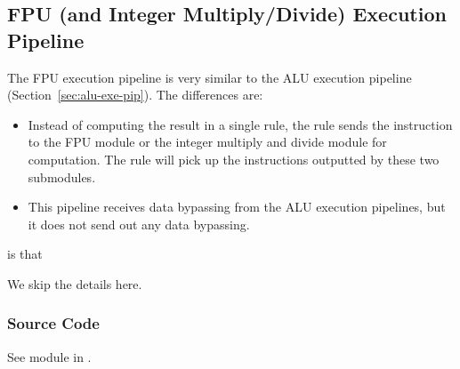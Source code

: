 \subsection{FPU (and Integer Multiply/Divide) Execution Pipeline}

The FPU execution pipeline is very similar to the ALU execution pipeline (Section~\ref{sec:alu-exe-pip}).
The differences are:
\begin{itemize}
    \item Instead of computing the result in a single rule, the  rule sends the instruction to the FPU module or the integer multiply and divide module for computation.
    The  rule will pick up the instructions outputted by these two submodules.
    \item This pipeline receives data bypassing from the ALU execution pipelines, but it does not send out any data bypassing.
\end{itemize}
 is that 

We skip the details here.

\subsubsection{Source Code}
See module  in .
